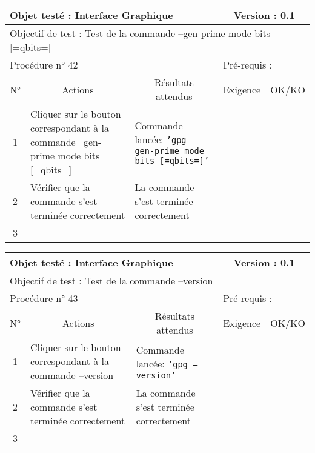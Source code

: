 \documentclass{../res/univ-projet}
\begin{document}
\begin{center}
\begin{tabular}{|c|p{5cm}|p{5cm}|p{1.5cm}|p{1.5cm}|}
\hline
\multicolumn{3}{|l|}{Objet testé : Interface Graphique} & \multicolumn{2}{c|}{Version : 0.1}\\ \hline
\multicolumn{5}{|l|}{Objectif de test : Test de la commande –gen-prime mode bits [=qbits=]}\\ \hline
\multicolumn{3}{|l|}{Procédure n° 42} & \multicolumn{2}{p{3cm}|}{Pré-requis : }\\ \hline
\multicolumn{1}{|c|}{N°} & \multicolumn{1}{c|}{Actions} & \multicolumn{1}{c|}{Résultats attendus} & 
\multicolumn{1}{c|}{Exigence} & \multicolumn{1}{c|}{OK/KO}\\ \hline
1 & Cliquer sur le bouton correspondant à la commande –gen-prime mode bits [=qbits=] & Commande lancée: \texttt{'gpg –gen-prime mode bits [=qbits=]'} &  & \\
2 & Vérifier que la commande s'est terminée correctement & La commande s'est terminée correctement &  & \\
3 &  &  &  & \\ \hline
\end{tabular}
\vskip 2.2cm


\begin{tabular}{|c|p{5cm}|p{5cm}|p{1.5cm}|p{1.5cm}|}
\hline
\multicolumn{3}{|l|}{Objet testé : Interface Graphique} & \multicolumn{2}{c|}{Version : 0.1}\\ \hline
\multicolumn{5}{|l|}{Objectif de test : Test de la commande –version}\\ \hline
\multicolumn{3}{|l|}{Procédure n° 43} & \multicolumn{2}{p{3cm}|}{Pré-requis : }\\ \hline
\multicolumn{1}{|c|}{N°} & \multicolumn{1}{c|}{Actions} & \multicolumn{1}{c|}{Résultats attendus} & 
\multicolumn{1}{c|}{Exigence} & \multicolumn{1}{c|}{OK/KO}\\ \hline
1 & Cliquer sur le bouton correspondant à la commande –version & Commande lancée: \texttt{'gpg –version'} &  & \\
2 & Vérifier que la commande s'est terminée correctement & La commande s'est terminée correctement &  & \\
3 &  &  &  & \\ \hline
\end{tabular}
\vskip 2.2cm



\end{center}
\end{document}

